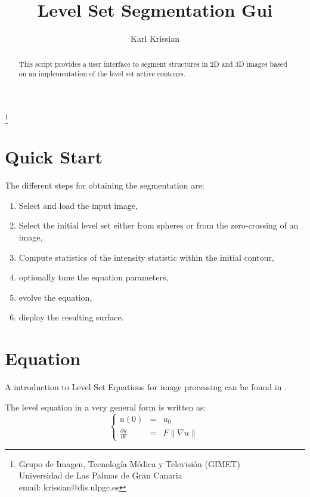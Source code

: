 \documentclass{article}
\begin{document}
\title{Level Set Segmentation Gui}
\author{Karl Krissian}
\thanks{
Grupo de Imagen, Tecnolog\'ia M\'edica y Televisi\'on (GIMET)\\
Universidad de Las Palmas de Gran Canaria\\
email: krissian@dis.ulpgc.es
}


\maketitle

\begin{abstract}
This script provides a user interface to segment structures in 2D and 3D images based on an implementation of the level set active contours.
\end{abstract}


\section{Quick Start}

The different steps for obtaining the segmentation are:
\begin{enumerate}
  \item Select and load the input image,
  \item Select the initial level set either from spheres or from the zero-crossing of an image,
  \item Compute statistics of the intensity statistic within the initial contour,
  \item optionally tune the equation parameters,
  \item evolve the equation,
  \item display the resulting surface.
\end{enumerate}


\section{Equation}
A introduction to Level Set Equations for image processing can be found in 
\cite{Sethian99book,Sapiro01,Osher2002,OsherParagios2003}.

The level equation in a very general form is written as:
\begin{equation}\label{eq:GenLS}
    \left\{ \begin{array}{lcl} u(0) &=& u_0 \\%
    \frac{\partial u}{\partial t} &=& F \| \nabla u \| \end{array} \right.
\end{equation}
\end{document}
